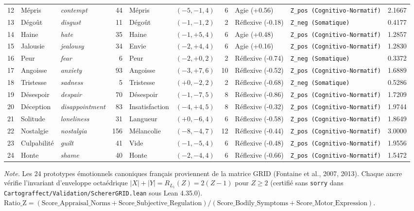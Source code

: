 \begin{table}[htbp]
\begin{threeparttable}
\begin{tabular}{r l l r l c r l l r}
12 & Mépris & \textit{contempt} & 44 & Mépris & $(-5, -1, 4)$ & 6 & Agie (+0.56) & \texttt{Z\_pos (Cognitivo-Normatif)} & 2.1667 \\
13 & Dégoût & \textit{disgust} & 11 & Dégoût & $(-1, -1, 2)$ & 2 & Réflexive (-0.18) & \texttt{Z\_neg (Somatique)} & 0.4177 \\
14 & Haine & \textit{hate} & 35 & Haine & $(-1, +5, 4)$ & 6 & Agie (+0.48) & \texttt{Z\_pos (Cognitivo-Normatif)} & 1.2857 \\
15 & Jalousie & \textit{jealousy} & 34 & Envie & $(-2, +4, 4)$ & 6 & Agie (+0.16) & \texttt{Z\_pos (Cognitivo-Normatif)} & 1.2830 \\
16 & Peur & \textit{fear} & 6 & Peur & $(-2, +0, 2)$ & 2 & Réflexive (-0.74) & \texttt{Z\_neg (Somatique)} & 0.3372 \\
17 & Angoisse & \textit{anxiety} & 93 & Angoisse & $(-3, +7, 6)$ & 10 & Réflexive (-0.52) & \texttt{Z\_pos (Cognitivo-Normatif)} & 1.6889 \\
18 & Tristesse & \textit{sadness} & 5 & Tristesse & $(+0, -2, 2)$ & 2 & Réflexive (-0.68) & \texttt{Z\_neg (Somatique)} & 0.5286 \\
19 & Désespoir & \textit{despair} & 70 & Désespoir & $(-1, -7, 5)$ & 8 & Réflexive (-0.86) & \texttt{Z\_pos (Cognitivo-Normatif)} & 1.7209 \\
20 & Déception & \textit{disappointment} & 83 & Insatisfaction & $(-4, +4, 5)$ & 8 & Réflexive (-0.32) & \texttt{Z\_pos (Cognitivo-Normatif)} & 1.9744 \\
21 & Solitude & \textit{loneliness} & 31 & Langueur & $(+0, -6, 4)$ & 6 & Réflexive (-0.58) & \texttt{Z\_pos (Cognitivo-Normatif)} & 1.8649 \\
22 & Nostalgie & \textit{nostalgia} & 156 & Mélancolie & $(-8, -4, 7)$ & 12 & Réflexive (-0.44) & \texttt{Z\_pos (Cognitivo-Normatif)} & 3.0000 \\
23 & Culpabilité & \textit{guilt} & 41 & Vide & $(-1, -5, 4)$ & 6 & Réflexive (-0.48) & \texttt{Z\_pos (Cognitivo-Normatif)} & 1.9556 \\
24 & Honte & \textit{shame} & 40 & Honte & $(-2, -4, 4)$ & 6 & Réflexive (-0.66) & \texttt{Z\_pos (Cognitivo-Normatif)} & 1.5472 \\
\bottomrule
\end{tabular}
\begin{tablenotes}
\footnotesize
\textit{Note.} Les 24 prototypes émotionnels canoniques français proviennent de la matrice GRID (Fontaine et al., 2007, 2013). Chaque ancre vérifie l'invariant d'enveloppe octaédrique $|X| + |Y| = R_{L_1}(Z) = 2(Z - 1)$ pour $Z \ge 2$ (certifié sans \texttt{sorry} dans \texttt{Cartograffect/Validation/SchererGRID.lean} sous Lean 4.35.0). $\text{Ratio\_Z} = (\text{Score\_Appraisal\_Norms} + \text{Score\_Subjective\_Regulation}) / (\text{Score\_Bodily\_Symptoms} + \text{Score\_Motor\_Expression})$.
\end{tablenotes}
\end{threeparttable}
\end{table}

